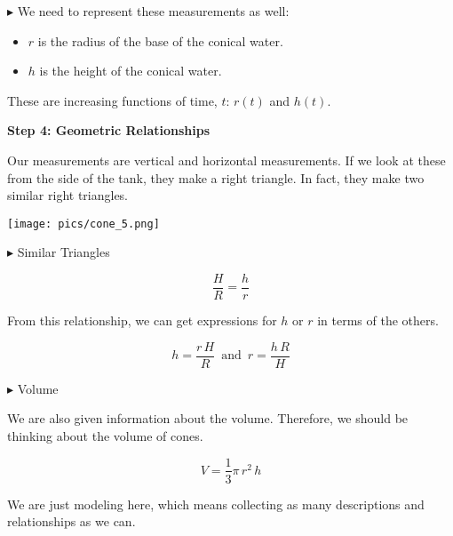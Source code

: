 \documentclass{ximera}
\begin{document}
$\blacktriangleright$ We need to represent these measurements as well:

\begin{itemize}
\item $r$ is the radius of the base of the conical water.
\item $h$ is the height of the conical water.
\end{itemize}

These are increasing functions of time, $t$: $r(t)$ and $h(t)$.










\textbf{\textcolor{purple!85!blue}{Step 4: Geometric Relationships}}


Our measurements are vertical and horizontal measurements.  If we look at these from the side of the tank, they make a right triangle.  In fact, they make two similar right triangles.






\begin{image}
\texttt{[image: pics/cone\_5.png]}
\end{image}




$\blacktriangleright$ Similar Triangles



\[
\frac{H}{R} = \frac{h}{r}
\]


From this relationship, we can get expressions for $h$ or $r$ in terms of the others. 



\[
h = \frac{r \, H}{R} \, \text{ and } \,  r = \frac{h \, R}{H}
\]







$\blacktriangleright$ Volume


We are also given information about the volume.  Therefore, we should be thinking about the volume of cones.

\[
V = \frac{1}{3} \pi \, r^2 \, h
\]







We are just modeling here, which means collecting as many descriptions and relationships as we can. \\
\end{document}
